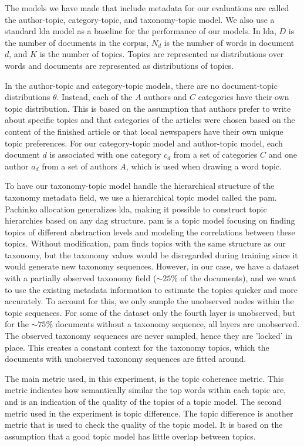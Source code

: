 The models we have made that include metadata for our evaluations are called the author-topic, category-topic, and taxonomy-topic model.
We also use a standard \gls{lda} model as a baseline for the performance of our models.
In \gls{lda}, $D$ is the number of documents in the corpus, $N_d$ is the number of words in document $d$, and $K$ is the number of topics.
Topics are represented as distributions over words and documents are represented as distributions of topics.

In the author-topic and category-topic models, there are no document-topic distributions $\theta$.
Instead, each of the $A$ authors and $C$ categories have their own topic distribution.
This is based on the assumption that authors prefer to write about specific topics and that categories of the articles were chosen based on the content of the finished article or that local newspapers have their own unique topic preferences.
For our category-topic model and author-topic model, each document $d$ is associated with one category $c_d$ from a set of categories $C$ and one author $a_d$ from a set of authors $A$, which is used when drawing a word topic.

To have our taxonomy-topic model handle the hierarchical structure of the taxonomy metadata field, we use a hierarchical topic model called the \acrfull{pam}.
Pachinko allocation generalizes \gls{lda}, making it possible to construct topic hierarchies based on any \gls{dag} structure.
\gls{pam} is a topic model focusing on finding topics of different abstraction levels and modeling the correlations between these topics.
Without modification, \gls{pam} finds topics with the same structure as our taxonomy, but the taxonomy values would be disregarded during training since it would generate new taxonomy sequences.
However, in our case, we have a dataset with a partially observed taxonomy field (${\sim}25\%$ of the documents), and we want to use the existing metadata information to estimate the topics quicker and more accurately.
To account for this, we only sample the unobserved nodes within the topic sequences.
For some of the dataset only the fourth layer is unobserved, but for the ${\sim}75\%$ documents without a taxonomy sequence, all layers are unobserved.
The observed taxonomy sequences are never sampled, hence they are 'locked' in place.
This creates a constant context for the taxonomy topics, which the documents with unobserved taxonomy sequences are fitted around.

The main metric used, in this experiment, is the topic coherence metric.
This metric indicates how semantically similar the top words within each topic are, and is an indication of the quality of the topics of a topic model.
The second metric used in the experiment is topic difference.
The topic difference is another metric that is used to check the quality of the topic model.
It is based on the assumption that a good topic model has little overlap between topics.

